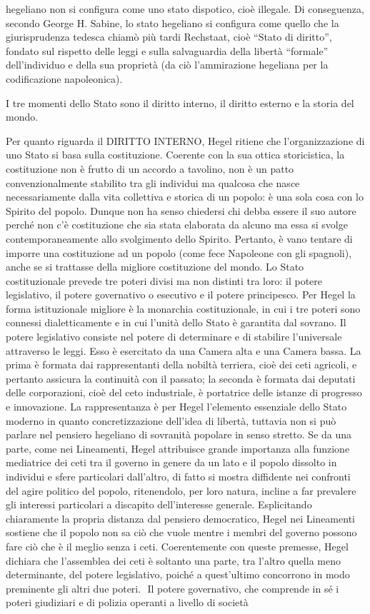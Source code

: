 \documentclass[a4paper,12pt,oneside,openany]{book}%
\begin{document}
hegeliano non si configura come uno stato dispotico, cioè illegale. Di conseguenza, secondo George H. Sabine, lo stato hegeliano si configura come quello che la giurisprudenza tedesca chiamò più tardi Rechstaat, cioè “Stato di diritto”, fondato sul rispetto delle leggi e sulla salvaguardia della libertà “formale” dell’individuo e della sua proprietà (da ciò l’ammirazione hegeliana per la codificazione napoleonica).

I tre momenti dello Stato sono il diritto interno, il diritto esterno e la storia del mondo.

Per quanto riguarda il DIRITTO INTERNO, Hegel ritiene che l’organizzazione di uno Stato si basa sulla costituzione. Coerente con la sua ottica storicistica, la costituzione non è frutto di un accordo a tavolino, non è un patto convenzionalmente stabilito tra gli individui ma qualcosa che nasce necessariamente dalla vita collettiva e storica di un popolo: è una sola cosa con lo Spirito del popolo. Dunque non ha senso chiedersi chi debba essere il suo autore perché non c’è costituzione che sia stata elaborata da alcuno ma essa si svolge contemporaneamente allo svolgimento dello Spirito. Pertanto, è vano tentare di imporre una costituzione ad un popolo (come fece Napoleone con gli spagnoli), anche se si trattasse della migliore costituzione del mondo. Lo Stato costituzionale prevede tre poteri divisi ma non distinti tra loro: il potere legislativo, il potere governativo o esecutivo e il potere principesco. Per Hegel la forma istituzionale migliore è la monarchia costituzionale, in cui i tre poteri sono connessi dialetticamente e in cui l’unità dello Stato è garantita dal sovrano. Il potere legislativo consiste nel potere di determinare e di stabilire l’universale attraverso le leggi. Esso è esercitato da una Camera alta e una Camera bassa. La prima è formata dai rappresentanti della nobiltà terriera, cioè dei ceti agricoli, e pertanto assicura la continuità con il passato; la seconda è formata dai deputati delle corporazioni, cioè del ceto industriale, è portatrice delle istanze di progresso e innovazione. La rappresentanza è per Hegel l’elemento essenziale dello Stato moderno in quanto concretizzazione dell’idea di libertà, tuttavia non si può parlare nel pensiero hegeliano di sovranità popolare in senso stretto. Se da una parte, come nei Lineamenti, Hegel attribuisce grande importanza alla funzione mediatrice dei ceti tra il governo in genere da un lato e il popolo dissolto in individui e sfere particolari dall’altro, di fatto si mostra diffidente nei confronti del agire politico del popolo, ritenendolo, per loro natura, incline a far prevalere gli interessi particolari a discapito dell’interesse generale. Esplicitando chiaramente la propria distanza dal pensiero democratico, Hegel nei Lineamenti sostiene che il popolo non sa ciò che vuole mentre i membri del governo possono fare ciò che è il meglio senza i ceti. Coerentemente con queste premesse, Hegel dichiara che l’assemblea dei ceti è soltanto una parte, tra l’altro quella meno determinante, del potere legislativo, poiché a quest’ultimo concorrono in modo preminente gli altri due poteri.  Il potere governativo, che comprende in sé i poteri giudiziari e di polizia operanti a livello di società 
\end{document}
